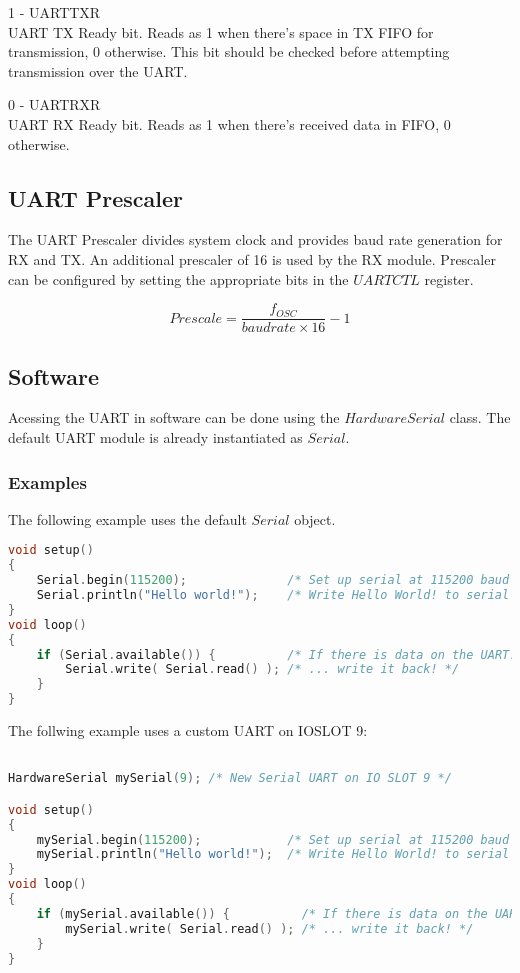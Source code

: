\begin{description}
\item{1 - UARTTXR} \hfill \\
UART TX Ready bit. Reads as 1 when there's space in TX FIFO for transmission, 0 otherwise. This bit should be checked before 
attempting transmission over the UART.

\item{0 - UARTRXR} \hfill \\
UART RX Ready bit. Reads as 1 when there's received data in FIFO, 0 otherwise.

\end{description}



\subsection{UART Prescaler}\label{UART Prescaler}
The UART Prescaler divides system clock and provides baud rate generation for RX and TX. 
An additional prescaler of 16 is used by the RX module. Prescaler can be configured by
setting the appropriate bits in the $UARTCTL$ register.

\begin{displaymath}
Prescale = \frac{f_{OSC}}{baudrate \times 16} - 1
\end{displaymath}

\subsection{Software}
Acessing the UART in software can be done using the $HardwareSerial$ class. The default UART module is 
already instantiated as $Serial$.
\subsubsection{Examples}
The following example uses the default $Serial$ object.
\begin{lstlisting}[language=C++]
void setup()
{
    Serial.begin(115200);              /* Set up serial at 115200 baud */
    Serial.println("Hello world!");    /* Write Hello World! to serial */
}
void loop()
{
    if (Serial.available()) {          /* If there is data on the UART... */
        Serial.write( Serial.read() ); /* ... write it back! */
    }
}
\end{lstlisting}

The follwing example uses a custom UART on IOSLOT 9:

\begin{lstlisting}[language=C++]

HardwareSerial mySerial(9); /* New Serial UART on IO SLOT 9 */

void setup()
{
    mySerial.begin(115200);            /* Set up serial at 115200 baud */
    mySerial.println("Hello world!");  /* Write Hello World! to serial */
}
void loop()
{
    if (mySerial.available()) {          /* If there is data on the UART... */
        mySerial.write( Serial.read() ); /* ... write it back! */
    }
}
\end{lstlisting}
